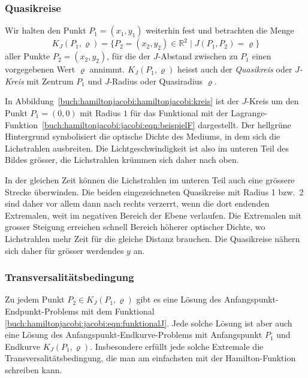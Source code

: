 %
%
\subsubsection{Quasikreise}
Wir halten den Punkt $P_1=(x_1,y_1)$ weiterhin fest und betrachten die
Menge
\[
K_J(P_1,\varrho)
=
\{
P_2=(x_2,y_2)\in\mathbb{R}^2
\mid
J(P_1,P_2) = \varrho
\}
\]
aller Punkte $P_2=(x_2,y_2)$, für die der $J$-Abstand zwischen
zu $P_1$ einen vorgegebenen Wert $\varrho$ annimmt.
$K_J(P_1,\varrho)$ heisst auch der {\em Quasikreis} oder {\em $J$-Kreis}
%
%
mit Zentrum $P_1$ und $J$-Radius oder Quasiradius $\varrho$.
%
%

\begin{beispiel}
In Abbildung~\ref{buch:hamiltonjacobi:hamiltonjacobi:kreis} ist der
$J$-Kreis um den Punkt $P_1=(0,0)$ mit Radius $1$ für das Funktional
mit der Lagrange-Funktion~\eqref{buch:hamiltonjacobi:jacobi:eqn:beispielF}
dargestellt.
Der hellgrüne Hintergrund symbolisiert die optische Dichte des Mediums,
in dem sich die Lichstrahlen ausbreiten.
%
Die Lichtgeschwindigkeit ist also im unteren Teil des Bildes grösser,
die Lichstrahlen krümmen sich daher nach oben.

In der gleichen Zeit können die Lichstrahlen im unteren Teil auch
eine grössere Strecke überwinden.
Die beiden eingezeichneten Quasikreise mit Radius 1 bzw.~2 sind 
daher vor allem dann nach rechts verzerrt, wenn die dort
endenden Extremalen, weit im negativen Bereich der Ebene verlaufen.
Die Extremalen mit grosser Steigung erreichen schnell Bereich höherer
optischer Dichte, wo Lichstrahlen mehr Zeit für die gleiche Distanz
brauchen.
Die Quasikreise nähern sich daher für grösser werdendes $y$ an.
\end{beispiel}

%
%
\subsubsection{Transversalitätsbedingung}
Zu jedem Punkt $P_2\in K_J(P_1,\varrho)$ gibt es eine Lösung des
Anfangspunkt-Endpunkt-Problems mit dem Funktional
\eqref{buch:hamiltonjacobi:jacobi:eqn:funktionalJ}.
Jede solche Lösung ist aber auch eine Lösung des
Anfangspunkt-Endkurve-Problems mit Anfangspunkt $P_1$ und
Endkurve $K_J(P_1,\varrho)$.
Insbesondere erfüllt jede solche Extremale die Transversalitätsbedingung,
die man am einfachsten mit der Hamilton-Funktion schreiben kann.

